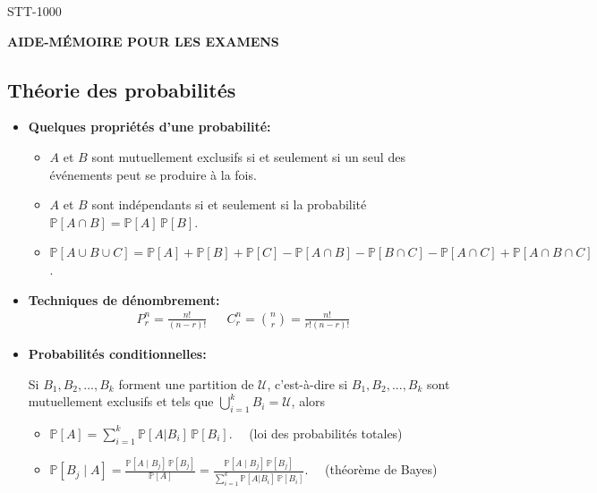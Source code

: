 \documentclass[12pt,french]{article}
\begin{document}
{ STT-1000}\hfill

\begin{center}
\textbf{{AIDE-MÉMOIRE POUR LES EXAMENS \\}}
\end{center}

\subsection*{Théorie des probabilités}

\begin{itemize}
\item {\bf Quelques propriétés d'une probabilité:}
\begin{itemize}

\item $A$ et $B$ sont mutuellement exclusifs si et seulement si un seul des événements peut se produire à la fois. 

\item $A$ et $B$ sont indépendants si et seulement si la probabilité 
$\mathbb{P}[A \cap B] =\mathbb{P}[A] \, \mathbb{P}[B]$.



\item $\mathbb{P}[A\cup B\cup C]=\mathbb{P}[A] + \mathbb{P}[B]
+ \mathbb{P}[C] - \mathbb{P}[A \cap B] - \mathbb{P}[B \cap C]
- \mathbb{P}[A \cap C]
+\mathbb{P}[A \cap B \cap C]$.
\end{itemize}

\item {\bf Techniques de dénombrement:}
\vspace{-0.2cm}
\begin{align*}
    P_r^n = \frac{n!}{(n-r)!} & & C_r^n ={n \choose r} = \frac{n!}{r!(n-r)!}
\end{align*}


\item {\bf Probabilités conditionnelles:}

Si $B_1, B_2, ..., B_k$ forment une partition de $\mathcal{U}$,
c'est-\`a-dire si $B_1, B_2, ..., B_k$ sont mutuellement exclusifs
et tels que $\bigcup\limits_{i=1}^k B_i=\mathcal{U}$, alors
\begin{itemize}

\item[$\circ$]
$\displaystyle
\mathbb{P}[A] = \sum_{i=1}^{k}\mathbb{P}[A|B_i]\,\mathbb{P}[B_i]
$.
~~(loi des probabilités totales)

\item[$\circ$]
$\displaystyle
\mathbb{P}[B_j\mid A] =
\frac{\mathbb{P}[A\mid B_j]\,\mathbb{P}[B_j]}{\mathbb{P}[A]}
=\frac{\mathbb{P}[A\mid B_j]\,\mathbb{P}[B_j]}{\sum_{i=1}^{k}\mathbb{P}[A|B_i]\,\mathbb{P}[B_i]}
$.
~~(théorème de Bayes)

\end{itemize}

\end{itemize}
\end{document}
